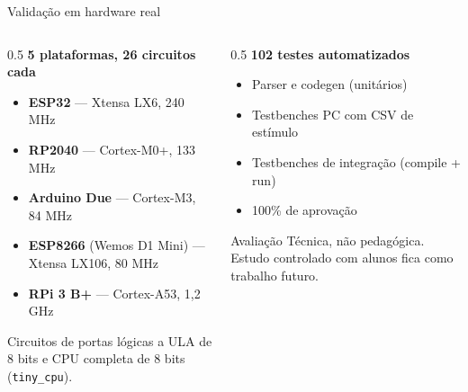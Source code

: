 \documentclass[10pt, aspectratio=169]{beamer}
\newcommand{\code}[1]{\texttt{\small #1}}
\begin{document}
\begin{frame}{Validação em hardware real}
  \begin{columns}[t]
    \begin{column}{0.5\textwidth}
      \textbf{5 plataformas, 26 circuitos cada}
      \begin{itemize}
        \item \textbf{ESP32} --- Xtensa LX6, 240 MHz
        \item \textbf{RP2040} --- Cortex-M0+, 133 MHz
        \item \textbf{Arduino Due} --- Cortex-M3, 84 MHz
        \item \textbf{ESP8266} (Wemos D1 Mini) --- Xtensa LX106, 80 MHz
        \item \textbf{RPi 3 B+} --- Cortex-A53, 1,2 GHz
      \end{itemize}
      \vspace{0.4em}
      Circuitos de portas lógicas a \alert{ULA de 8 bits} e
      \alert{CPU completa de 8 bits} (\code{tiny\_cpu}).
    \end{column}
    \begin{column}{0.5\textwidth}
      \textbf{102 testes automatizados}
      \begin{itemize}
        \item Parser e codegen (unitários)
        \item Testbenches PC com CSV de estímulo
        \item Testbenches de integração (compile + run)
        \item 100\% de aprovação
      \end{itemize}
      \vspace{0.4em}
      \begin{alertblock}{Avaliação}
        Técnica, não pedagógica. Estudo controlado com alunos fica como
        trabalho futuro.
      \end{alertblock}
    \end{column}
  \end{columns}
\end{frame}
\end{document}
